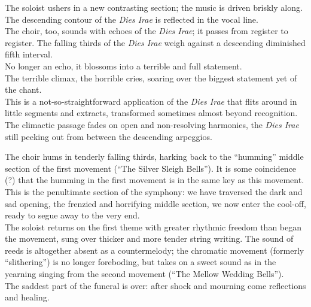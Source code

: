\documentclass{beamer}
\begin{document}
\begin{frame}
  The soloist ushers in a new contrasting section; the music is driven briskly along. 
  \pause \\ 
  The descending contour of the \textit{Dies Irae} is reflected in the vocal line. 
  \pause \\ 
  The choir, too, sounds with echoes of the \textit{Dies Irae}; it passes from register to register. The falling thirds of the \textit{Dies Irae} weigh against a descending diminished fifth interval. 
  \pause \\
  No longer an echo, it blossoms into a terrible and full statement. 
  \pause \\ 
  The terrible climax, the horrible cries, soaring over the biggest statement yet of the chant. 
  \pause \\ 
  This is a not-so-straightforward application of the \textit{Dies Irae} that flits around in little segments and extracts, transformed sometimes almost beyond recognition. 
  \pause \\ 
  The climactic passage fades on open and non-resolving harmonies, the \textit{Dies Irae} still peeking out from between the descending arpeggios. 
\end{frame} 

\begin{frame}
  The choir hums in tenderly falling thirds, harking back to the ``humming'' middle section of the first movement (``The Silver Sleigh Bells''). It is some coincidence (?) that the humming in the first movement is in the same key as this movement. 
  \pause \\
  This is the penultimate section of the symphony: we have traversed the dark and sad opening, the frenzied and horrifying middle section, we now enter the cool-off, ready to segue away to the very end. 
  \pause \\
  The soloist returns on the first theme with greater rhythmic freedom than began the movement, sung over thicker and more tender string writing. The sound of reeds is altogether absent as a countermelody; the chromatic movement (formerly ``slithering'') is no longer foreboding, but takes on a sweet sound as in the yearning singing from the second movement (``The Mellow Wedding Bells''). 
  \pause \\ 
  The saddest part of the funeral is over: after shock and mourning come reflections and healing. 
\end{frame} 
\end{document}
